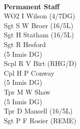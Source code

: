 \begin{multicols}{4}
  \\
  \textbf{Permanent Staff} \\
  WO2 I Wilson (4/7DG) \\
  Sgt S W Broer (16/5L) \\
  Sgt H Statham (16/5L) \\
  Sgt R Hesford \\ \indent (5 Innis DG) \\
  Scpl R V Birt (RHG/D) \\
  Cpl H P Conway \\ \indent (5 Innis DG) \\
  Tpr M W Shaw \\ \indent (5 Innis DG) \\
  Tpr D Mansell (16/5L) \\
  Sgt P F Rosier (REME)
\end{multicols}

\pagebreak
